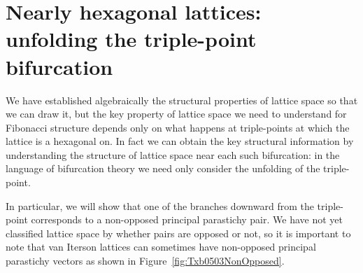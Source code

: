 \section[Unfolding the triple-point bifurcation]{Nearly hexagonal lattices: unfolding the triple-point bifurcation}
We have established algebraically the structural properties of lattice space so that we can draw it, but the key property of lattice space we need to understand for Fibonacci structure depends only on what happens at triple-points at which the lattice is a hexagonal on. In fact we can obtain the key structural information by understanding the structure of lattice space near each such bifurcation: in the language of bifurcation theory we need only consider the unfolding of the triple-point.  

In particular, we will show that one of the branches downward from the triple-point corresponds to a non-opposed principal parastichy pair. We have not yet classified lattice space by whether pairs are opposed or not, so it is important to note that van Iterson lattices can sometimes have non-opposed principal parastichy vectors as shown in  Figure~\ref{fig:Txb0503NonOpposed}. 

%

